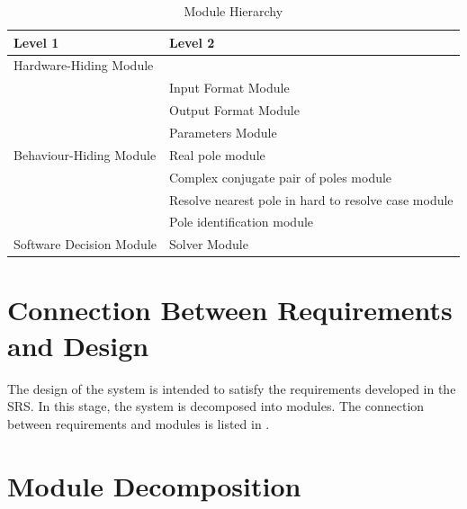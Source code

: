 \documentclass[12pt, titlepage]{article}
\begin{document}
\begin{table}[!ht]
\centering
\begin{tabular}{p{} p{}}
\toprule
\textbf{Level 1} & \textbf{Level 2}\\
\midrule

\multirow{1}{0.3\textwidth}{Hardware-Hiding Module} & \\

\midrule

\multirow{7}{0.3\textwidth}{Behaviour-Hiding Module}
  & Input Format Module\\
  & Output Format Module \\
  & Parameters Module\\
  & Real pole module\\
  & Complex conjugate pair of poles module\\ 
  & Resolve nearest pole in hard to resolve case module\\
  & Pole identification module\\
\midrule

{Software Decision Module} & Solver Module\\
\bottomrule

\end{tabular}
\caption{Module Hierarchy}
\label{tb:module}
\end{table}

\section{Connection Between Requirements and Design} \label{SecConnection}

The design of the system is intended to satisfy the requirements developed in
the SRS. In this stage, the system is decomposed into modules. The connection
between requirements and modules is listed in .


\section{Module Decomposition} \label{SecMD}
\end{document}
